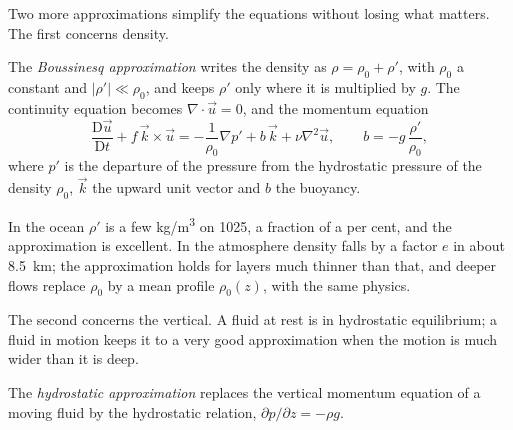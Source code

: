 \begin{omfigure}
\par{}\label{fig:b3:gfd-foundations:frame}
\end{omfigure}

Two more approximations simplify the equations without losing what
matters. The first concerns density.

\begin{definition}\label{def:b3:gfd-foundations:boussinesq}
The \emph{Boussinesq approximation} writes
the density as $\rho = \rho_0 + \rho'$, with $\rho_0$ a constant and
$|\rho'| \ll \rho_0$, and keeps $\rho'$ only where it is multiplied by $g$.
The continuity equation becomes $\nabla\cdot\vec u = 0$, and the momentum
equation
\[
\frac{\mathrm D\vec u}{\mathrm Dt} + f\,\vec k\times\vec u =
-\frac{1}{\rho_0}\nabla p' + b\,\vec k + \nu\nabla^2\vec u ,
\qquad b = -g\,\frac{\rho'}{\rho_0} ,
\]
where $p'$ is the departure of the pressure from the hydrostatic pressure
of the density $\rho_0$, $\vec k$ the upward unit vector and $b$ the
buoyancy.
\end{definition}

In the ocean $\rho'$ is a few \unit{kg/m^3} on \num{1025}, a fraction of a
per cent, and the approximation is excellent. In the atmosphere density
falls by a factor $e$ in about \qty{8.5}{km}; the approximation holds for
layers much thinner than that, and deeper flows replace $\rho_0$ by a
mean profile $\rho_0(z)$, with the same physics.

The second concerns the vertical. A fluid at rest is in hydrostatic
equilibrium; a fluid in motion keeps it to a very good approximation when
the motion is much wider than it is deep.

\begin{definition}\label{def:b3:gfd-foundations:hydrostatic}
The \emph{hydrostatic approximation}
replaces the vertical momentum equation of a moving fluid by the
hydrostatic relation, $\partial p/\partial z = -\rho g$.
\end{definition}

